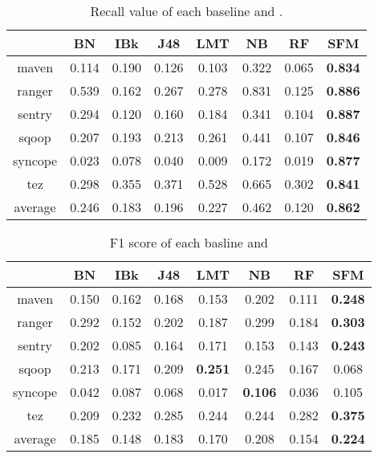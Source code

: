 \begin{table}[!ht]
\caption{Recall value of each baseline and \simfinmo.}
\centering
\begin{tabular}{|c|c|c|c|c|c|c|c|}
\hline
& BN & IBk & J48 & LMT & NB & RF & SFM \\ \hline
maven & 0.114 & 0.190 & 0.126 & 0.103 & 0.322 & 0.065 & \textbf{0.834} \\ \hline
ranger & 0.539 & 0.162 & 0.267 & 0.278 & 0.831 & 0.125 & \textbf{0.886} \\ \hline
sentry & 0.294 & 0.120 & 0.160 & 0.184 & 0.341 & 0.104 & \textbf{0.887} \\ \hline
sqoop & 0.207 & 0.193 & 0.213 & 0.261 & 0.441 & 0.107 & \textbf{0.846} \\ \hline
syncope & 0.023 & 0.078 & 0.040 & 0.009 & 0.172 & 0.019 & \textbf{0.877} \\ \hline
tez & 0.298 & 0.355 & 0.371 & 0.528 & 0.665 & 0.302 & \textbf{0.841} \\ \hline
average & 0.246 & 0.183 & 0.196 & 0.227 & 0.462 & 0.120 & \textbf{0.862} \\ \hline
\end{tabular}%
\label{tab:recall}
\end{table}


\begin{table}[!ht]
\caption{F1 score of each basline and \simfinmo}
\centering
\begin{tabular}{|c|c|c|c|c|c|c|c|}
\hline
& BN & IBk & J48 & LMT & NB & RF & SFM \\ \hline
maven & 0.150 & 0.162 & 0.168 & 0.153 & 0.202 & 0.111 & \textbf{0.248} \\ \hline
ranger & 0.292 & 0.152 & 0.202 & 0.187 & 0.299 & 0.184 & \textbf{0.303} \\ \hline
sentry & 0.202 & 0.085 & 0.164 & 0.171 & 0.153 & 0.143 & \textbf{0.243} \\ \hline
sqoop & 0.213 & 0.171 & 0.209 & \textbf{0.251} & 0.245 & 0.167 & 0.068 \\ \hline
syncope & 0.042 & 0.087 & 0.068 & 0.017 & \textbf{0.106} & 0.036 & 0.105 \\ \hline
tez & 0.209 & 0.232 & 0.285 & 0.244 & 0.244 & 0.282 & \textbf{0.375} \\ \hline
average & 0.185 & 0.148 & 0.183 & 0.170 & 0.208 & 0.154 & \textbf{0.224} \\ \hline
\end{tabular}%
\label{tab:f1score}
\end{table}


